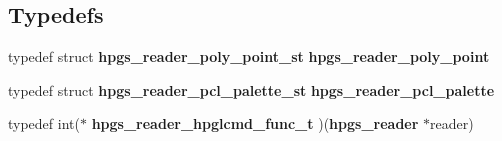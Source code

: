 \subsection*{Typedefs}
\begin{CompactItemize}
\item 
typedef struct {\bf hpgs\_\-reader\_\-poly\_\-point\_\-st} \textbf{hpgs\_\-reader\_\-poly\_\-point}\label{group__reader_g4233c42f8f157dfd34fbf704a9eefd11}

\item 
typedef struct {\bf hpgs\_\-reader\_\-pcl\_\-palette\_\-st} \textbf{hpgs\_\-reader\_\-pcl\_\-palette}\label{group__reader_g23384ae34cc53b73e033a90721614351}

\item 
typedef int($\ast$ \textbf{hpgs\_\-reader\_\-hpglcmd\_\-func\_\-t} )({\bf hpgs\_\-reader} $\ast$reader)\label{group__reader_g40224d7369a3a297ff59fc5d3fb81f1c}

\end{CompactItemize}
